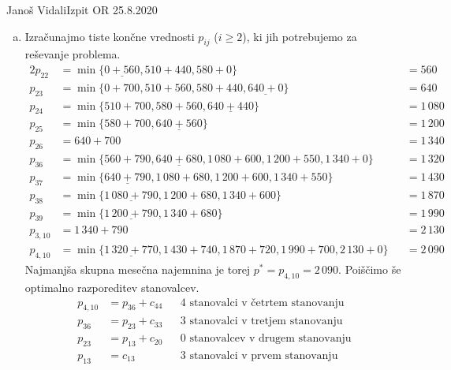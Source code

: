 \begin{naloga}{Janoš Vidali}{Izpit OR 25.8.2020}
\begin{odgovor}
\begin{enumerate}[(a)]
\item Izračunajmo tiste končne vrednosti $p_{ij}$ ($i \ge 2$),
ki jih potrebujemo za reševanje problema.
\begin{alignat*}{2}
p_{22} &= \min\{\underline{0+560}, 510+440, 580+0\} &&= 560 \\
p_{23} &= \min\{0+700, 510+560, 580+440, \underline{640+0}\} &&= 640 \\
p_{24} &= \min\{510+700, 580+560, \underline{640+440}\} &&= 1\,080 \\
p_{25} &= \min\{580+700, \underline{640+560}\} &&= 1\,200 \\
p_{26} &= 640 + 700 &&= 1\,340 \\
p_{36} &= \min\{560+790, \underline{640+680}, 1\,080+600, 1\,200+550, 1\,340+0\} &&= 1\,320 \\
p_{37} &= \min\{\underline{640+790}, 1\,080+680, 1\,200+600, 1\,340+550\} &&= 1\,430 \\
p_{38} &= \min\{\underline{1\,080+790}, 1\,200+680, 1\,340+600\} &&= 1\,870 \\
p_{39} &= \min\{\underline{1\,200+790}, 1\,340+680\} &&= 1\,990 \\
p_{3,10} &= 1\,340 + 790 &&= 2\,130 \\
p_{4,10} &= \min\{\underline{1\,320+770}, 1\,430+740, 1\,870+720, 1\,990+700, 2\,130+0\} &&= 2\,090
\end{alignat*}
Najmanjša skupna mesečna najemnina je torej $p^* = p_{4,10} = 2\,090$.
Poiščimo še optimalno razporeditev stanovalcev.
\begin{align*}
p_{4,10} &= p_{36} + c_{44} && \text{$4$ stanovalci v četrtem stanovanju} \\
p_{36}   &= p_{23} + c_{33} && \text{$3$ stanovalci v tretjem stanovanju} \\
p_{23}   &= p_{13} + c_{20} && \text{$0$ stanovalcev v drugem stanovanju} \\
p_{13}   &= c_{13}          && \text{$3$ stanovalci v prvem stanovanju}
\end{align*}
\end{enumerate}
\end{odgovor}
\end{naloga}

